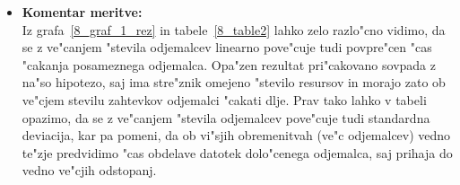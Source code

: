 \begin{itemize}
    \pagebreak
	\item \textbf{Komentar meritve: } \\
		Iz grafa~\ref{8_graf_1_rez} in tabele~\ref{8_table2} lahko zelo razlo"cno vidimo, da se z ve"canjem "stevila odjemalcev linearno pove"cuje tudi povpre"cen "cas "cakanja posameznega odjemalca. Opa"zen rezultat pri"cakovano sovpada z na"so hipotezo, saj ima stre"znik omejeno "stevilo resursov in morajo zato ob ve"cjem stevilu zahtevkov odjemalci  "cakati dlje. Prav tako lahko v tabeli opazimo, da se z ve"canjem "stevila odjemalcev pove"cuje tudi standardna deviacija, kar pa pomeni, da ob vi"sjih obremenitvah (ve"c odjemalcev) vedno te"zje predvidimo "cas obdelave datotek dolo"cenega odjemalca, saj prihaja do vedno ve"cjih odstopanj.
\end{itemize}

\newpage
